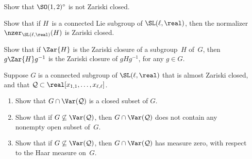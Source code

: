 \begin{exercises}

\item \label{SO12notZar}
 Show that $\SO(1,2)^\circ$ is not Zariski closed.

\item \label{N(G)ZarClosed}
 Show that if $H$~is a connected Lie subgroup of
$\SL(\ell,\real)$, then the normalizer $\nzer_{\SL(\ell,\real)}(H)$ is Zariski
closed.

\item Show that if $\Zar{H}$ is the Zariski closure of a
subgroup~$H$ of~$G$, then $g \Zar{H} g^{-1}$ is the
Zariski closure of $g H g^{-1}$, for any $g \in G$.

\item \label{VarClosed}
 Suppose $G$ is a connected subgroup of
$\SL(\ell,\real)$ that is almost Zariski closed, and that $\mathcal{Q} \subset
\real[x_{1,1},\ldots,x_{\ell,\ell}]$.
 \begin{enumerate}
 \item \label{VarClosed-closed}
 Show that $G \cap \Var(\mathcal{Q})$ is a closed subset of $G$.
 \item \label{VarClosed-nodense}
 Show that if $G \not\subseteq \Var(\mathcal{Q})$, then $G
\cap \Var(\mathcal{Q})$ does not contain any nonempty open
subset of~$G$.
 \item \label{VarClosed-meas0}
 Show that if $G \not\subseteq \Var(\mathcal{Q})$, then $G
\cap \Var(\mathcal{Q})$ has measure zero, with respect to the
Haar measure on~$G$.
 \end{enumerate}


\end{exercises}
